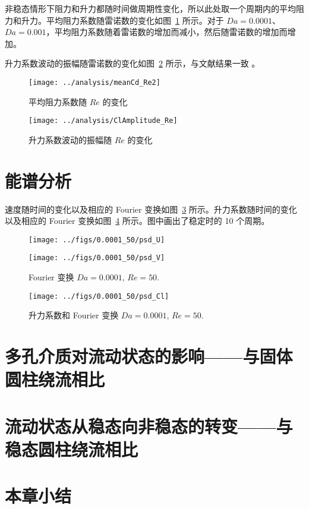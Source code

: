 非稳态情形下阻力和升力都随时间做周期性变化，所以此处取一个周期内的平均阻力和升力。平均阻力系数随雷诺数的变化如图~\ref{fig: meanCd} 所示。对于 $Da=0.0001$、$Da=0.001$，平均阻力系数随着雷诺数的增加而减小，然后随雷诺数的增加而增加。

升力系数波动的振幅随雷诺数的变化如图~\ref{fig: ClAmplitude} 所示，与文献结果一致 \cite{Park1998}。

\begin{figure}
	\centering
	\texttt{[image: ../analysis/meanCd\_Re2]}
	\caption{平均阻力系数随 $Re$ 的变化}
	\label{fig: meanCd}
\end{figure}

\begin{figure}
	\centering
	\texttt{[image: ../analysis/ClAmplitude\_Re]}
	\caption{升力系数波动的振幅随 $Re$ 的变化}
	\label{fig: ClAmplitude}
\end{figure}

\section{能谱分析} %

速度随时间的变化以及相应的 Fourier 变换如图~\ref{fig: velocity Fourier} 所示。升力系数随时间的变化以及相应的 Fourier 变换如图~\ref{fig: Cl Fourier} 所示。图中画出了稳定时的 10 个周期。

\begin{figure}
	\centering
	\begin{minipage}{\textwidth}
		\centering
		\texttt{[image: ../figs/0.0001\_50/psd\_U]}
	\end{minipage}
	\centering
	\begin{minipage}{\textwidth}
		\centering
		\texttt{[image: ../figs/0.0001\_50/psd\_V]}
	\end{minipage}
	\caption{Fourier 变换 $Da=0.0001$, $Re=50$.}
	\label{fig: velocity Fourier}
\end{figure}

\begin{figure}
	\centering
	\texttt{[image: ../figs/0.0001\_50/psd\_Cl]}
	\caption{升力系数和 Fourier 变换 $Da=0.0001$, $Re=50$.}
	\label{fig: Cl Fourier}
\end{figure}

\section{多孔介质对流动状态的影响——与固体圆柱绕流相比}

\section{流动状态从稳态向非稳态的转变——与稳态圆柱绕流相比}

\section{本章小结}
